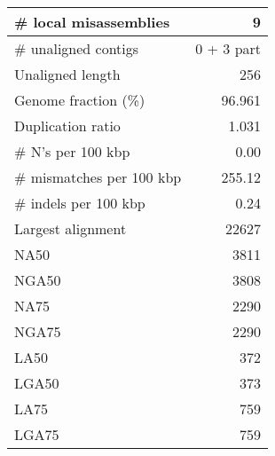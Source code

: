 \documentclass[12pt,a4paper]{article}
\begin{document}
\begin{table}[ht]
\begin{center}
\begin{tabular}{|l*{1}{|r}|}
\# local misassemblies & 9 \\ \hline
\# unaligned contigs & 0 + 3 part \\ \hline
Unaligned length & 256 \\ \hline
Genome fraction (\%) & 96.961 \\ \hline
Duplication ratio & 1.031 \\ \hline
\# N's per 100 kbp & 0.00 \\ \hline
\# mismatches per 100 kbp & 255.12 \\ \hline
\# indels per 100 kbp & 0.24 \\ \hline
Largest alignment & 22627 \\ \hline
NA50 & 3811 \\ \hline
NGA50 & 3808 \\ \hline
NA75 & 2290 \\ \hline
NGA75 & 2290 \\ \hline
LA50 & 372 \\ \hline
LGA50 & 373 \\ \hline
LA75 & 759 \\ \hline
LGA75 & 759 \\ \hline
\end{tabular}
\end{center}
\end{table}
\end{document}
